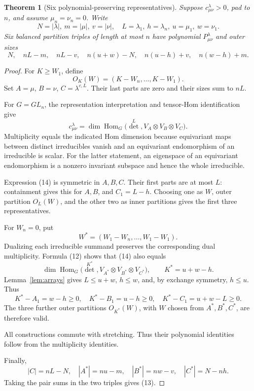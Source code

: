 \documentclass[11pt]{article}
\newtheorem{theorem}{Theorem}
\begin{document}
\begin{theorem}[Six polynomial-preserving representatives]\label{thm:six}
Suppose \(c^\lambda_{\mu\nu}>0\), pad to \(n\), and assume \(\mu_n=\nu_n=0\). Write
\[
N=|\lambda|,\ m=|\mu|,\ v=|\nu|,\quad
L=\lambda_1,\ h=\lambda_n,\ u=\mu_1,\ w=\nu_1.
\]
Six balanced partition triples of length at most \(n\) have polynomial \(P^\lambda_{\mu\nu}\) and outer sizes
\[
N,\quad nL-m,\quad nL-v,\quad n(u+w)-N,\quad
n(u-h)+v,\quad n(w-h)+m.
                                                               \tag{13}
\]
\end{theorem}

\begin{proof}
For \(K\ge W_1\), define
\[
O_K(W)=(K-W_n,\ldots,K-W_1).
\]
Set \(A=\mu\), \(B=\nu\), \(C=\lambda^{c,L}\). Their last parts are zero and their sizes sum to \(nL\).

For \(G=GL_n\), the representation interpretation and tensor-Hom identification give
\[
c^\lambda_{\mu\nu}
=
\dim\operatorname{Hom}_G
\bigl(\det^L,V_A\otimes V_B\otimes V_C\bigr).
                                                               \tag{14}
\]
Multiplicity equals the indicated Hom dimension because equivariant maps between distinct irreducibles vanish and an equivariant endomorphism of an irreducible is scalar. For the latter statement, an eigenspace of an equivariant endomorphism is a nonzero invariant subspace and hence the whole irreducible.

Expression (14) is symmetric in \(A,B,C\). Their first parts are at most \(L\): containment gives this for \(A,B\), and \(C_1=L-h\). Choosing one as \(W\), outer partition \(O_L(W)\), and the other two as inner partitions gives the first three representatives.

For \(W_n=0\), put
\[
W^*=(W_1-W_n,\ldots,W_1-W_1).
\]
Dualizing each irreducible summand preserves the corresponding dual multiplicity. Formula (12) shows that (14) also equals
\[
\dim\operatorname{Hom}_G
\bigl(\det^{K^*},
V_{A^*}\otimes V_{B^*}\otimes V_{C^*}\bigr),
\qquad K^*=u+w-h.
                                                               \tag{15}
\]
Lemma~\ref{lem:arrays} gives \(L\le u+w\), \(h\le w\), and, by exchange symmetry, \(h\le u\). Thus
\[
K^*-A_1=w-h\ge0,\quad
K^*-B_1=u-h\ge0,\quad
K^*-C_1=u+w-L\ge0.
\]
The three further outer partitions \(O_{K^*}(W)\), with \(W\) chosen from \(A^*,B^*,C^*\), are therefore valid.

All constructions commute with stretching. Thus their polynomial identities follow from the multiplicity identities.

Finally,
\[
|C|=nL-N,\quad |A^*|=nu-m,\quad |B^*|=nw-v,\quad |C^*|=N-nh.
\]
Taking the pair sums in the two triples gives (13).
\end{proof}
\end{document}
